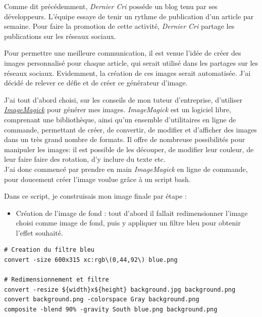 \bigskip

Comme dit précédemment, \emph{Dernier Cri} posséde un blog tenu par ses
développeurs. L'équipe essaye de tenir un rythme de publication d'un
article par semaine. Pour faire la promotion de cette activité,
\emph{Dernier Cri} partage les publications sur les réseaux sociaux.

\bigskip

Pour permettre une meilleure communication, il est venue l'idée de créer
des images personnalisé pour chaque article, qui serait utilisé dans les
partages sur les réseaux sociaux. Evidemment, la création de ces images
serait automatisée. J'ai décidé de relever ce défie et de créer ce
générateur d'image.

\bigskip

J'ai tout d'abord choisi, sur les conseils de mon tuteur d'entreprise,
d'utiliser
\href{https://www.imagemagick.org/script/index.php}{\emph{ImageMagick}}
pour générer mes images. \emph{ImageMagick} est un logiciel libre,
comprenant une bibliothèque, ainsi qu'un ensemble d'utilitaires en ligne
de commande, permettant de créer, de convertir, de modifier et
d'afficher des images dans un très grand nombre de formats. Il offre de
nombreuse possibilités pour manipuler les images: il est possible de les
découper, de modifier leur couleur, de leur faire faire des rotation,
d'y inclure du texte etc.\\
J'ai donc commencé par prendre en main \emph{ImageMagick} en ligne de
commande, pour doucement créer l'image voulue grâce à un script bash.

\bigskip

Dans ce script, je construisais mon image finale par étape :

\begin{itemize}
\tightlist
\item
  Création de l'image de fond : tout d'abord il fallait redimensionner
  l'image choisi comme image de fond, puis y appliquer un filtre bleu
  pour obtenir l'effet souhaité.
\end{itemize}

\begin{verbatim}
# Creation du filtre bleu
convert -size 600x315 xc:rgb\(0,44,92\) blue.png

# Redimensionnement et filtre
convert -resize ${width}x${height} background.jpg background.png
convert background.png -colorspace Gray background.png
composite -blend 90% -gravity South blue.png background.png
\end{verbatim}

